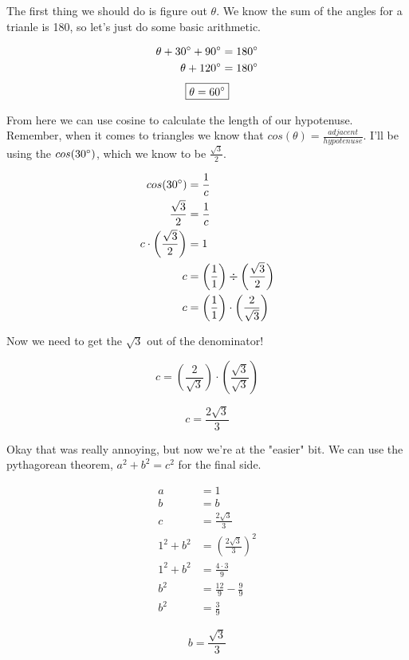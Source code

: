 \documentclass[10pt,letterpaper]{amspset}
\begin{document}
\begin{solution}[Solution]
The first thing we should do is figure out $\theta$. We know the sum of the angles for a trianle is 180\degree, so let's just do some basic arithmetic.  

\begin{align}
    \theta + 30\degree + 90\degree &= 180\degree \\
    \theta + 120\degree &= 180\degree
\end{align}
\[\boxed{ \theta = 60\degree }\]

From here we can use cosine to calculate the length of our hypotenuse. Remember, when it comes to triangles we know that $cos(\theta) = \frac{adjacent}{hypotenuse}$. I'll be using the $cos(30\degree)$, which we know to be $\frac{\sqrt{3}}{2}$.

\begin{align}
    cos(30\degree) &= \frac{1}{c} \\
    \frac{\sqrt{3}}{2} &= \frac{1}{c} \\
    c \cdot \left( \frac{\sqrt{3}}{2} \right) &= 1 \\
    c &= \left( \frac{1}{1} \right) \div \left( \frac{\sqrt{3}}{2} \right) \\
    c &= \left( \frac{1}{1} \right) \cdot \left( \frac{2}{\sqrt{3}} \right) \\
\end{align}

Now we need to get the $\sqrt{3}$ out of the denominator! 

\[c = \left( \frac{2}{\sqrt{3}} \right) \cdot \left( \frac{\sqrt{3}}{\sqrt{3}} \right)\]

\[\boxed{c = \frac{2 \sqrt{3}}{3}}\]

Okay that was really annoying, but now we're at the "easier" bit. We can use the pythagorean theorem, $a^2 + b^2 = c^2$ for the final side.

\begin{align}
    a &= 1 \\
    b &= b \\
    c &= \frac{2\sqrt{3}}{3}\\[+3mm]
    1^2 + b^2 &= \left( \frac{2\sqrt{3}}{3} \right) ^2 \\[+3mm]
    1^2 + b^2 &= \frac{4 \cdot 3}{9} \\[+3mm]
    b^2 &= \frac{12}{9} - \frac{9}{9} \\[+3mm]
    b^2 &= \frac{3}{9}
\end{align}

\[\boxed{ b = \frac{\sqrt{3}}{3}}\]

\end{solution}
\end{document}

